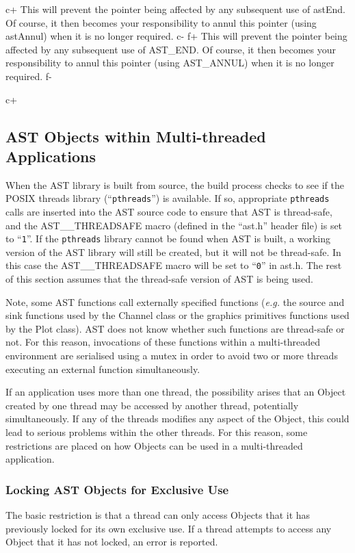 \documentclass[twoside,11pt]{article}
\begin{document}
c+
This will prevent the pointer being affected by any subsequent use of
astEnd. Of course, it then becomes your responsibility to annul this
pointer (using astAnnul) when it is no longer required.
c-
f+
This will prevent the pointer being affected by any subsequent use of
AST\_END. Of course, it then becomes your responsibility to annul this
pointer (using AST\_ANNUL) when it is no longer required.
f-


c+
\subsection{AST Objects within Multi-threaded Applications}

When the AST library is built from source, the build process checks to
see if the POSIX threads library (``{\tt pthreads}'') is available. If so,
appropriate {\tt pthreads} calls are inserted into the AST source code to
ensure that AST is thread-safe, and the AST\_\_THREADSAFE macro (defined
in the ``ast.h'' header file) is set to ``{\tt 1}''. If the {\tt pthreads}
library cannot be found when AST is built, a working version of the AST
library will still be created, but it will not be thread-safe. In this
case the AST\_\_THREADSAFE macro will be set to ``{\tt 0}'' in ast.h. The
rest of this section assumes that the thread-safe version of AST is being
used.

Note, some AST functions call externally specified functions (\emph{e.g.}
the source and sink functions used by the Channel class or the graphics
primitives functions used by the Plot class). AST does not know whether
such functions are thread-safe or not. For this reason, invocations of these
functions within a multi-threaded environment are serialised using a mutex
in order to avoid two or more threads executing an external function
simultaneously.

If an application uses more than one thread, the possibility arises that
an Object created by one thread may be accessed by another thread, potentially
simultaneously. If any of the threads modifies any aspect of the Object,
this could lead to serious problems within the other threads. For this
reason, some restrictions are placed on how Objects can be used in a
multi-threaded application.

\subsubsection{Locking AST Objects for Exclusive Use}
The basic restriction is that a thread can only access Objects that it
has previously locked for its own exclusive use. If a thread attempts to
access any Object that it has not locked, an error is reported.
\end{document}

